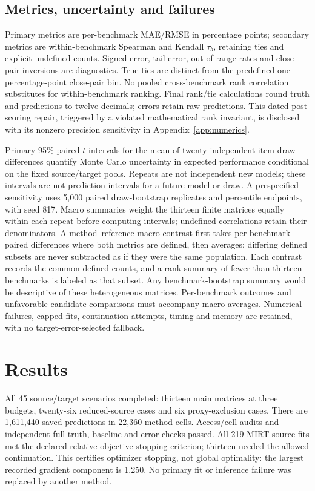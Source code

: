 \documentclass{article}
\begin{document}
\subsection{Metrics, uncertainty and failures}
Primary metrics are per-benchmark MAE/RMSE in percentage points; secondary metrics are within-benchmark Spearman and Kendall $\tau_b$, retaining ties and explicit undefined counts. Signed error, tail error, out-of-range rates and close-pair inversions are diagnostics. True ties are distinct from the predefined one-percentage-point close-pair bin. No pooled cross-benchmark rank correlation substitutes for within-benchmark ranking. Final rank/tie calculations round truth and predictions to twelve decimals; errors retain raw predictions. This dated post-scoring repair, triggered by a violated mathematical rank invariant, is disclosed with its nonzero precision sensitivity in Appendix~\ref{app:numerics}.

Primary 95\% paired $t$ intervals for the mean of twenty independent item-draw differences quantify Monte Carlo uncertainty in expected performance conditional on the fixed source/target pools. Repeats are not independent new models; these intervals are not prediction intervals for a future model or draw. A prespecified sensitivity uses 5,000 paired draw-bootstrap replicates and percentile endpoints, with seed 817. Macro summaries weight the thirteen finite matrices equally within each repeat before computing intervals; undefined correlations retain their denominators. A method--reference macro contrast first takes per-benchmark paired differences where both metrics are defined, then averages; differing defined subsets are never subtracted as if they were the same population. Each contrast records the common-defined counts, and a rank summary of fewer than thirteen benchmarks is labeled as that subset. Any benchmark-bootstrap summary would be descriptive of these heterogeneous matrices. Per-benchmark outcomes and unfavorable candidate comparisons must accompany macro-averages. Numerical failures, capped fits, continuation attempts, timing and memory are retained, with no target-error-selected fallback.

\section{Results}\label{sec:results}
All 45 source/target scenarios completed: thirteen main matrices at three budgets, twenty-six reduced-source cases and six proxy-exclusion cases. There are 1,611,440 saved predictions in 22,360 method cells. Access/cell audits and independent full-truth, baseline and error checks passed. All 219 MIRT source fits met the declared relative-objective stopping criterion; thirteen needed the allowed continuation. This certifies optimizer stopping, not global optimality: the largest recorded gradient component is 1.250. No primary fit or inference failure was replaced by another method.
\end{document}
